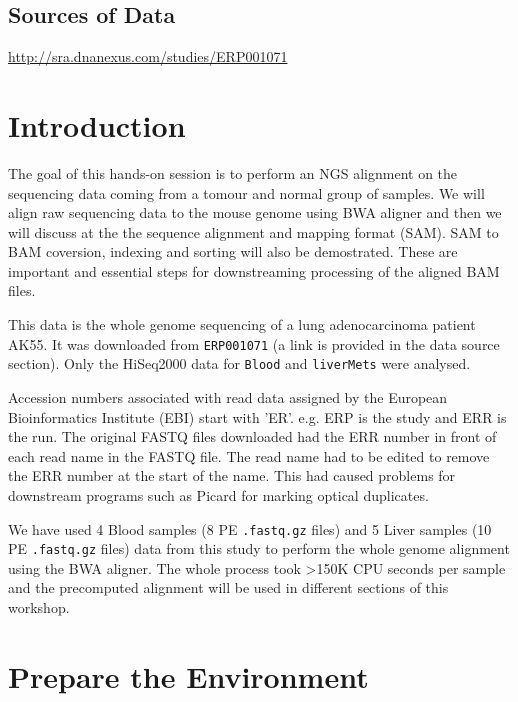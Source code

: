 \subsection{Sources of Data}
  \url{http://sra.dnanexus.com/studies/ERP001071}

\clearpage

\section{Introduction}

\begin{information}
The goal of this hands-on session is to perform an NGS alignment on the sequencing data coming from a tomour and normal group of samples. We will align raw sequencing data to the mouse genome using BWA aligner and then we will discuss at the the sequence alignment and mapping format (SAM). SAM to BAM coversion, indexing and sorting will also be demostrated. These are important and essential steps for downstreaming processing of the aligned BAM files. 
 
This data is the whole genome sequencing of a lung adenocarcinoma patient AK55. It was downloaded from \texttt{ERP001071} (a link is provided in the data source section). Only the HiSeq2000 data for \texttt{Blood} and \texttt{liverMets} were analysed.

Accession numbers associated with read data assigned by the European Bioinformatics Institute (EBI) start with 'ER'. e.g. ERP is the study and ERR is the run. The original FASTQ files downloaded had the ERR number in front of each read name in the FASTQ file. The read name had to be edited to remove the ERR number at the start of the name. This had caused problems for downstream programs such as Picard for marking optical duplicates.

We have used 4 Blood samples (8 PE \texttt{.fastq.gz} files) and 5 Liver samples (10 PE \texttt{.fastq.gz} files) data from this study to perform the whole genome alignment using the BWA aligner. The whole process took >150K CPU seconds per sample and the precomputed alignment will be used in different sections of this workshop. 
\end{information}

\section{Prepare the Environment}


